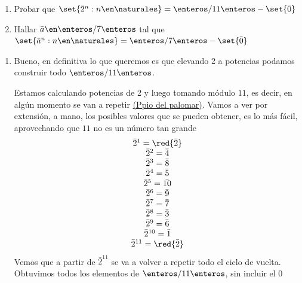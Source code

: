\begin{enunciado}{\ejercicio}
  \begin{enumerate}[label = \roman*)]

    \item Probar que $\set{\bar{2}^n : n \en \naturales} = \enteros/11\enteros - \set{\bar{0}}$

    \item Hallar $\bar{a} \en \enteros/7\enteros$ tal que
          $\set{\bar{a}^n : n \en \naturales} = \enteros/7\enteros - \set{\bar{0}}$
  \end{enumerate}
\end{enunciado}

\begin{enumerate}[label = \roman*)]
  \item
        Bueno, en definitiva lo que queremos es que elevando 2 a potencias podamos construir todo $\enteros/11\enteros$.

        Estamos calculando potencias de 2 y luego tomando módulo $11$, es decir, en algún momento se van a repetir
        \href{https://es.wikipedia.org/wiki/Principio_del_palomar}{(Ppio del palomar)}.
        Vamos a ver por extensión, a mano,  los posibles valores que se pueden obtener, es lo  más fácil, aprovechando que $11$
        no es un número tan grande
        $$
          \begin{array}{c}
            \bar{2}^1  = \red{\bar{2}}   \\
            \bar{2}^2  = \bar{4}         \\
            \bar{2}^3  = \bar{8}         \\
            \bar{2}^4  = \bar{5}         \\
            \bar{2}^5  = \bar{10}        \\
            \bar{2}^6  = \bar{9}         \\
            \bar{2}^7  = \bar{7}         \\
            \bar{2}^8  = \bar{3}         \\
            \bar{2}^9  = \bar{6}         \\
            \bar{2}^{10} = \bar{1}       \\
            \bar{2}^{11} = \red{\bar{2}} \\
          \end{array}
        $$
        Vemos que a partir de $\bar{2}^{11}$ se va a volver a repetir todo el ciclo de vuelta.
        Obtuvimos todos los elementos de $\enteros/11\enteros$, sin incluir el 0


\end{enumerate}
